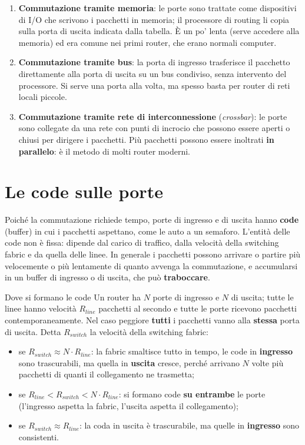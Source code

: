 \begin{enumerate}
    \item \textbf{Commutazione tramite memoria}: le porte sono trattate come dispositivi di I/O che scrivono i pacchetti in
          memoria; il processore di routing li copia sulla porta di uscita indicata dalla tabella. È un po' lenta (serve
          accedere alla memoria) ed era comune nei primi router, che erano normali computer.
    \item \textbf{Commutazione tramite bus}: la porta di ingresso trasferisce il pacchetto direttamente alla porta di uscita
          su un bus condiviso, senza intervento del processore. Si serve una porta alla volta, ma spesso basta per router di
          reti locali piccole.
    \item \textbf{Commutazione tramite rete di interconnessione} (\emph{crossbar}): le porte sono collegate da una rete con
          punti di incrocio che possono essere aperti o chiusi per dirigere i pacchetti. Più pacchetti possono essere
          inoltrati \textbf{in parallelo}: è il metodo di molti router moderni.
\end{enumerate}

\section{Le code sulle porte}

Poiché la commutazione richiede tempo, porte di ingresso e di uscita hanno \textbf{code} (buffer) in cui i pacchetti
aspettano, come le auto a un semaforo. L'entità delle code non è fissa: dipende dal carico di traffico, dalla velocità
della switching fabric e da quella delle linee. In generale i pacchetti possono arrivare o partire più velocemente o
più lentamente di quanto avvenga la commutazione, e accumularsi in un buffer di ingresso o di uscita, che può
\textbf{traboccare}.

\begin{esempio}{Dove si formano le code}
Un router ha $N$ porte di ingresso e $N$ di uscita; tutte le linee hanno velocità $R_{line}$ pacchetti al secondo e tutte
le porte ricevono pacchetti contemporaneamente. Nel caso peggiore \textbf{tutti} i pacchetti vanno alla \textbf{stessa}
porta di uscita. Detta $R_{switch}$ la velocità della switching fabric:
\begin{itemize}
    \item se $R_{switch} \approx N \cdot R_{line}$: la fabric smaltisce tutto in tempo, le code in \textbf{ingresso} sono
          trascurabili, ma quella in \textbf{uscita} cresce, perché arrivano $N$ volte più pacchetti di quanti il collegamento ne trasmetta;
    \item se $R_{line} < R_{switch} < N \cdot R_{line}$: si formano code \textbf{su entrambe} le porte (l'ingresso aspetta la
          fabric, l'uscita aspetta il collegamento);
    \item se $R_{switch} \approx R_{line}$: la coda in uscita è trascurabile, ma quelle in \textbf{ingresso} sono consistenti.
\end{itemize}
\end{esempio}

